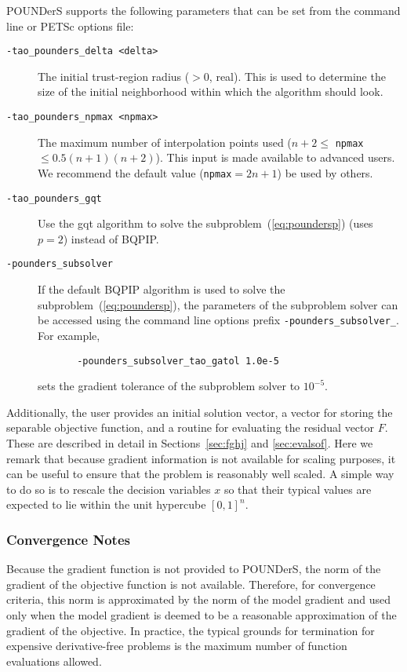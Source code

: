 POUNDerS supports the following parameters that can be set from the
command line or PETSc options file:
\begin{description}
  \item[\texttt{-tao\_pounders\_delta <delta>}] The initial trust-region 
  radius ($>0$, real).
  This is  used to determine the size of the initial neighborhood within
  which the algorithm should look. 
  
  \item[\texttt{-tao\_pounders\_npmax <npmax>}] The maximum number of 
  interpolation points used
  ($n+2\leq$ \texttt{npmax} $\leq 0.5(n+1)(n+2)$). This input is made
  available to advanced users. We recommend the default
  value (\texttt{npmax}$=2n+1$) be used by others.

  \item[\texttt{-tao\_pounders\_gqt}] Use the gqt algorithm to solve the
  subproblem~(\ref{eq:poundersp}) (uses $p=2$) instead of BQPIP.

  \item[\texttt{-pounders\_subsolver}] If the default
BQPIP algorithm is used to solve the 
  subproblem~(\ref{eq:poundersp}), the parameters of the subproblem solver
  can be accessed using the command line options  prefix
\texttt{-pounders\_subsolver\_}.  For example, 
\begin{verbatim}
       -pounders_subsolver_tao_gatol 1.0e-5
\end{verbatim}  
sets the gradient tolerance of the subproblem solver to $10^{-5}$.
\end{description}

Additionally,  the user provides an initial solution vector, a vector for
storing
the separable objective function, and a routine for evaluating the residual
vector $F$.  These are described in detail in 
Sections~\ref{sec:fghj} and \ref{sec:evalsof}. 
Here we remark that because gradient information is not available for
scaling purposes, it can be useful to ensure that the problem is
reasonably well scaled. A simple way to do so is to rescale the
decision variables $x$ so that their typical values are expected to lie
within the unit hypercube $[0,1]^n$.

\subsubsection{Convergence Notes}
Because the gradient function is not provided to POUNDerS, 
the norm of the gradient of the objective function is not available.
Therefore, 
for convergence criteria, this norm is approximated by the norm of the
model gradient and used only when the model gradient is deemed to be a
reasonable approximation of the gradient of the objective. In practice, the
typical grounds for termination for expensive derivative-free problems is
the maximum number of function evaluations allowed. 

